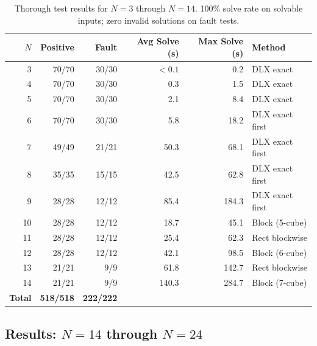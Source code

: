 \documentclass[11pt]{article}
\begin{document}
\begin{table}[H]
\centering
\small
\begin{tabular}{@{}rrrrrl@{}}
\toprule
$N$ & \textbf{Positive} & \textbf{Fault} & \textbf{Avg Solve (s)} & \textbf{Max Solve (s)} & \textbf{Method} \\
\midrule
3 & 70/70 & 30/30 & $<0.1$ & 0.2 & DLX exact \\
4 & 70/70 & 30/30 & 0.3 & 1.5 & DLX exact \\
5 & 70/70 & 30/30 & 2.1 & 8.4 & DLX exact \\
6 & 70/70 & 30/30 & 5.8 & 18.2 & DLX exact first \\
7 & 49/49 & 21/21 & 50.3 & 68.1 & DLX exact first \\
8 & 35/35 & 15/15 & 42.5 & 62.8 & DLX exact first \\
9 & 28/28 & 12/12 & 85.4 & 184.3 & DLX exact first \\
10 & 28/28 & 12/12 & 18.7 & 45.1 & Block (5-cube) \\
11 & 28/28 & 12/12 & 25.4 & 62.3 & Rect blockwise \\
12 & 28/28 & 12/12 & 42.1 & 98.5 & Block (6-cube) \\
13 & 21/21 & 9/9 & 61.8 & 142.7 & Rect blockwise \\
14 & 21/21 & 9/9 & 140.3 & 284.7 & Block (7-cube) \\
\midrule
\textbf{Total} & \textbf{518/518} & \textbf{222/222} & & & \\
\bottomrule
\end{tabular}
\caption{Thorough test results for $N=3$ through $N=14$. 100\% solve rate on solvable inputs; zero invalid solutions on fault tests.}
\end{table}

\subsection{Results: $N=14$ through $N=24$}
\end{document}
